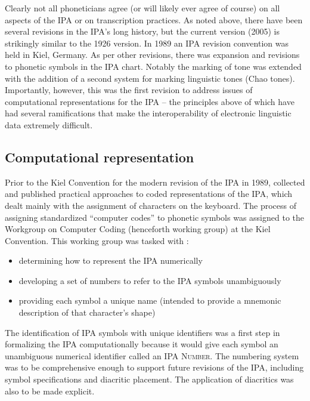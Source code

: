 Clearly not all phoneticians agree (or will likely ever agree of course) on all 
aspects of the IPA or on transcription practices. As noted above, there have 
been several revisions in the IPA's long history, but the current version (2005) 
is strikingly similar to the 1926 version. In 1989 an IPA revision convention 
was held in Kiel, Germany. As per other revisions, there was expansion and revisions 
to phonetic symbols in the IPA chart. Notably the marking of tone was extended 
with the addition of a second system for marking linguistic tones (Chao tones). 
Importantly, however, this was the first revision to address issues of 
computational representations for the IPA -- the principles above of which 
have had several ramifications that make the interoperability of electronic 
linguistic data extremely difficult.


\subsection{Computational representation}

Prior to the Kiel Convention for the modern revision of the IPA in 1989, 
\cite{Wells1987} collected and published practical approaches to coded 
representations of the IPA, which dealt mainly with the assignment of 
characters on the keyboard. The process of assigning standardized ``computer 
codes'' to phonetic symbols was assigned to the Workgroup on Computer 
Coding (henceforth working group) at the Kiel Convention. This working 
group was tasked with \citep{Esling1990,EslingGaylord1993}: 

\begin{itemize}
	\item determining how to represent the IPA numerically
	\item developing a set of numbers to refer to the IPA symbols unambiguously
	\item providing each symbol a unique name (intended to provide a mnemonic description of that character's shape)
\end{itemize}

\noindent The identification of IPA symbols with unique identifiers was 
a first step in formalizing the IPA computationally because it would give 
each symbol an unambiguous numerical identifier called an \textsc{IPA Number}. 
The numbering system was to be comprehensive enough to support future revisions 
of the IPA, including symbol specifications and diacritic placement. The 
application of diacritics was also to be made explicit. 

